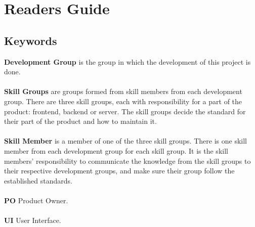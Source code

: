 \chapter*{Readers Guide}
\section*{Keywords}
\textbf{Development Group} is the group in which the development of this project is done.\\\\
\textbf{Skill Groups} are groups formed from skill members from each development group. There are three skill groups, each with responsibility for a part of the product: frontend, backend or server. The skill groups decide the standard for their part of the product and how to maintain it.\\\\
\textbf{Skill Member} is a member of one of the three skill groups. There is one skill member from each development group for each skill group. It is the skill members' responsibility to communicate the knowledge from the skill groups to their respective development groups, and make sure their group follow the established standards.\\\\
\textbf{PO} Product Owner.\\\\
\textbf{UI} User Interface.\\\\
